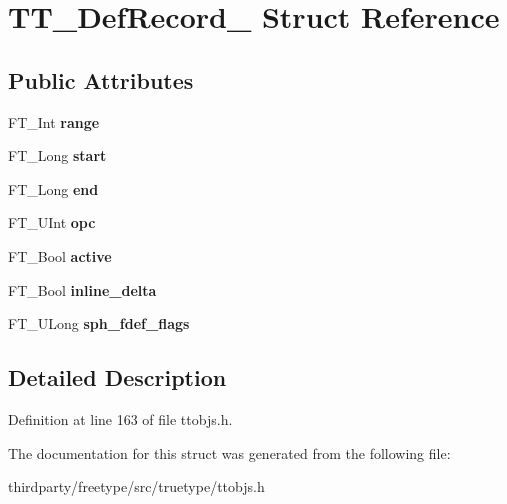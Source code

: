 \hypertarget{struct_t_t___def_record__}{}\section{T\+T\+\_\+\+Def\+Record\+\_\+ Struct Reference}
\label{struct_t_t___def_record__}
\subsection*{Public Attributes}
\begin{DoxyCompactItemize}
\item 
\mbox{\label{struct_t_t___def_record___a9367042106b21f85e0437e532182783f}} 
F\+T\+\_\+\+Int {\bfseries range}
\item 
\mbox{\label{struct_t_t___def_record___a50285a2b7650de2f6d9a2d76c1fdd51a}} 
F\+T\+\_\+\+Long {\bfseries start}
\item 
\mbox{\label{struct_t_t___def_record___a71f3869e43adc43ae1ae2da56bf76df3}} 
F\+T\+\_\+\+Long {\bfseries end}
\item 
\mbox{\label{struct_t_t___def_record___a6dbab99d44b7d4556247bfdb55091a9e}} 
F\+T\+\_\+\+U\+Int {\bfseries opc}
\item 
\mbox{\label{struct_t_t___def_record___a8bc47104c63a35c0f0fd0d5e7c969392}} 
F\+T\+\_\+\+Bool {\bfseries active}
\item 
\mbox{\label{struct_t_t___def_record___ab58bc5152cdcc5f2e435eb86b88a920e}} 
F\+T\+\_\+\+Bool {\bfseries inline\+\_\+delta}
\item 
\mbox{\label{struct_t_t___def_record___a3d3185b062355f7ff270eee9511e1f3f}} 
F\+T\+\_\+\+U\+Long {\bfseries sph\+\_\+fdef\+\_\+flags}
\end{DoxyCompactItemize}


\subsection{Detailed Description}


Definition at line 163 of file ttobjs.\+h.



The documentation for this struct was generated from the following file\+:\begin{DoxyCompactItemize}
\item 
thirdparty/freetype/src/truetype/ttobjs.\+h\end{DoxyCompactItemize}
